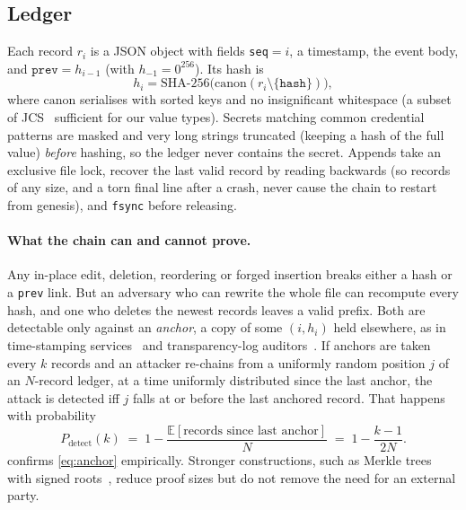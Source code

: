 \documentclass[11pt]{article}
\begin{document}
\subsection{Ledger}\label{sec:ledger}
Each record $r_i$ is a JSON object with fields \texttt{seq}$=i$, a timestamp, the event body, and $\texttt{prev} = h_{i-1}$ (with $h_{-1} = 0^{256}$). Its hash is
\begin{equation}
  h_i = \mathrm{SHA\text{-}256}\big(\mathrm{canon}(r_i \setminus \{\texttt{hash}\})\big),
\end{equation}
where $\mathrm{canon}$ serialises with sorted keys and no insignificant whitespace (a subset of JCS~\cite{rfc8785} sufficient for our value types). Secrets matching common credential patterns are masked and very long strings truncated (keeping a hash of the full value) \emph{before} hashing, so the ledger never contains the secret. Appends take an exclusive file lock, recover the last valid record by reading backwards (so records of any size, and a torn final line after a crash, never cause the chain to restart from genesis), and \texttt{fsync} before releasing.

\paragraph{What the chain can and cannot prove.} Any in-place edit, deletion, reordering or forged insertion breaks either a hash or a \texttt{prev} link. But an adversary who can rewrite the whole file can recompute every hash, and one who deletes the newest records leaves a valid prefix. Both are detectable only against an \emph{anchor}, a copy of some $(i, h_i)$ held elsewhere, as in time-stamping services~\cite{haber1991timestamp} and transparency-log auditors~\cite{rfc9162}. If anchors are taken every $k$ records and an attacker re-chains from a uniformly random position $j$ of an $N$-record ledger, at a time uniformly distributed since the last anchor, the attack is detected iff $j$ falls at or before the last anchored record. That happens with probability
\begin{equation}\label{eq:anchor}
  P_{\text{detect}}(k) \;=\; 1 - \frac{\mathbb{E}[\text{records since last anchor}]}{N} \;=\; 1 - \frac{k-1}{2N}.
\end{equation}
 confirms \cref{eq:anchor} empirically. Stronger constructions, such as Merkle trees with signed roots~\cite{crosby2009tamper,nono}, reduce proof sizes but do not remove the need for an external party.
\end{document}
